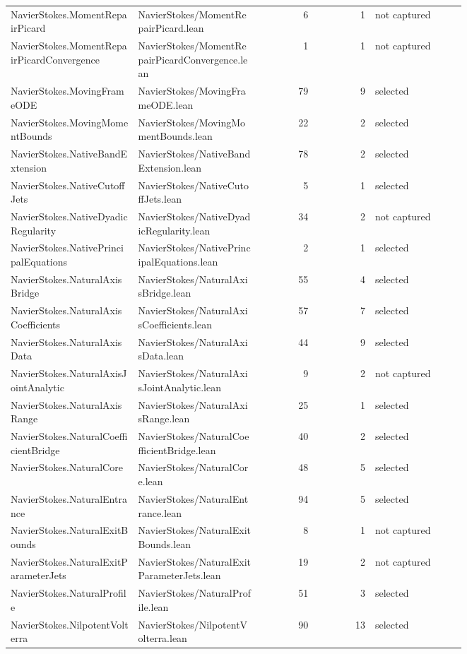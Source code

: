 \documentclass[10pt]{article}
\begin{document}
\begin{longtable}{p{0.28\linewidth}p{0.27\linewidth}r r p{0.20\linewidth}}
NavierStokes.MomentRepairPicard & NavierStokes/MomentRepairPicard.lean & 6 & 1 & not captured\\
NavierStokes.MomentRepairPicardConvergence & NavierStokes/MomentRepairPicardConvergence.lean & 1 & 1 & not captured\\
NavierStokes.MovingFrameODE & NavierStokes/MovingFrameODE.lean & 79 & 9 & selected\\
NavierStokes.MovingMomentBounds & NavierStokes/MovingMomentBounds.lean & 22 & 2 & selected\\
NavierStokes.NativeBandExtension & NavierStokes/NativeBandExtension.lean & 78 & 2 & selected\\
NavierStokes.NativeCutoffJets & NavierStokes/NativeCutoffJets.lean & 5 & 1 & selected\\
NavierStokes.NativeDyadicRegularity & NavierStokes/NativeDyadicRegularity.lean & 34 & 2 & not captured\\
NavierStokes.NativePrincipalEquations & NavierStokes/NativePrincipalEquations.lean & 2 & 1 & selected\\
NavierStokes.NaturalAxisBridge & NavierStokes/NaturalAxisBridge.lean & 55 & 4 & selected\\
NavierStokes.NaturalAxisCoefficients & NavierStokes/NaturalAxisCoefficients.lean & 57 & 7 & selected\\
NavierStokes.NaturalAxisData & NavierStokes/NaturalAxisData.lean & 44 & 9 & selected\\
NavierStokes.NaturalAxisJointAnalytic & NavierStokes/NaturalAxisJointAnalytic.lean & 9 & 2 & not captured\\
NavierStokes.NaturalAxisRange & NavierStokes/NaturalAxisRange.lean & 25 & 1 & selected\\
NavierStokes.NaturalCoefficientBridge & NavierStokes/NaturalCoefficientBridge.lean & 40 & 2 & selected\\
NavierStokes.NaturalCore & NavierStokes/NaturalCore.lean & 48 & 5 & selected\\
NavierStokes.NaturalEntrance & NavierStokes/NaturalEntrance.lean & 94 & 5 & selected\\
NavierStokes.NaturalExitBounds & NavierStokes/NaturalExitBounds.lean & 8 & 1 & not captured\\
NavierStokes.NaturalExitParameterJets & NavierStokes/NaturalExitParameterJets.lean & 19 & 2 & not captured\\
NavierStokes.NaturalProfile & NavierStokes/NaturalProfile.lean & 51 & 3 & selected\\
NavierStokes.NilpotentVolterra & NavierStokes/NilpotentVolterra.lean & 90 & 13 & selected\\

\end{longtable}
\end{document}
